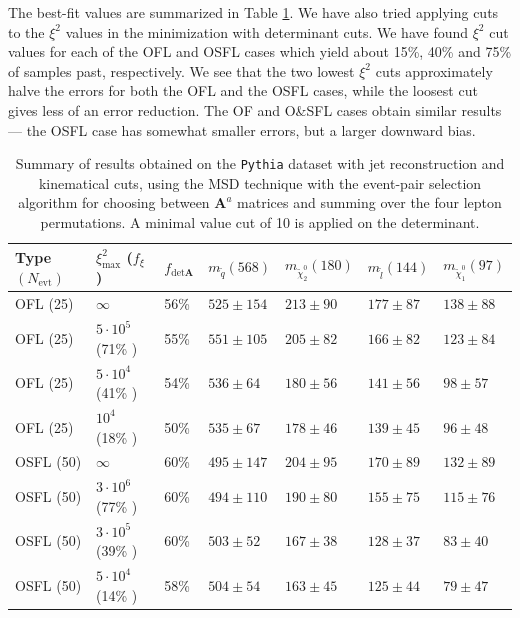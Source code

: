 \documentclass[twoside,english]{uiofysmaster}
\begin{document}
The best-fit values are summarized in Table \ref{table:table_jetrec}. We have also tried applying cuts to the $\xi^2$ values in the minimization with determinant cuts. We have found $\xi^2$ cut values for each of the OFL and OSFL cases which yield about 15\%, 40\% and 75\% of samples past, respectively. We see that the two lowest $\xi^2$ cuts approximately halve the errors for both the OFL and the OSFL cases, while the loosest cut gives less of an error reduction. The OF and O\&SFL cases obtain similar results --- the OSFL case has somewhat smaller errors, but a larger downward bias.
\begin{table}[hbt]
	\small
	\centering
	\begin{tabular}{| l | l | l || l | l | l | l |}
		\hline
		Type $(N_\mathrm{evt})$ & $\xi^2_\mathrm{max}$ ($f_\xi$) & $f_{\mathrm{det}\mathbf A}$ & $m_{\tilde q} (568)$ & $m_{\tilde \chi_2^0} (180)$ & $m_{\tilde l} (144)$ & $m_{\tilde \chi_1^0} (97)$ \\
		\hline \hline
		OFL (25) 	& 	$\infty$ 				& 56\%		&  $525 \pm 154$	&	$213\pm90$	&	$177\pm87$	& 	$138\pm88$	\\
    OFL (25)  &   $5\cdot10^5$ (71\% )  & 55\%    & $551\pm105$ & $205\pm82$  & $166\pm82$  &   $123\pm84$  \\
    OFL (25)  &   $5\cdot10^4$ (41\% )  & 54\%    & $536\pm64$  & $180\pm56$  & $141\pm56$  &   $98\pm57$ \\
		OFL (25) 	& 	$10^4$ (18\% ) 		& 50\% 	& $535\pm67$	&	$178\pm46$	&	$139\pm45$	& 	$96\pm48$	\\
		OSFL (50) 	& 	$\infty$ 				& 60\%		& $495\pm147$	&	$204\pm95$	&	$170\pm89$	& 	$132\pm89$	\\
    OSFL (50)   &   $3\cdot10^6$ (77\% )  & 60\%    & $494\pm110$ & $190\pm80$  & $155\pm75$  &   $115\pm76$  \\
		OSFL (50) 	& 	$3\cdot10^5$ (39\% ) 	& 60\%		& $503\pm52$	&	$167\pm38$	&	$128\pm37$	& 	$83\pm40$	\\
    OSFL (50)   &   $5\cdot10^4$ (14\% )  & 58\%    & $504\pm54$  & $163\pm45$  & $125\pm44$  &   $79\pm47$ \\
		\hline
	\end{tabular}
	\caption{Summary of results obtained on the {\tt Pythia} dataset with jet reconstruction and kinematical cuts, using the MSD technique with the event-pair selection algorithm for choosing between $\mathbf A^a$ matrices and summing over the four lepton permutations. A minimal value cut of 10 is applied on the determinant.}
	\label{table:table_jetrec}
\end{table}
\end{document}
